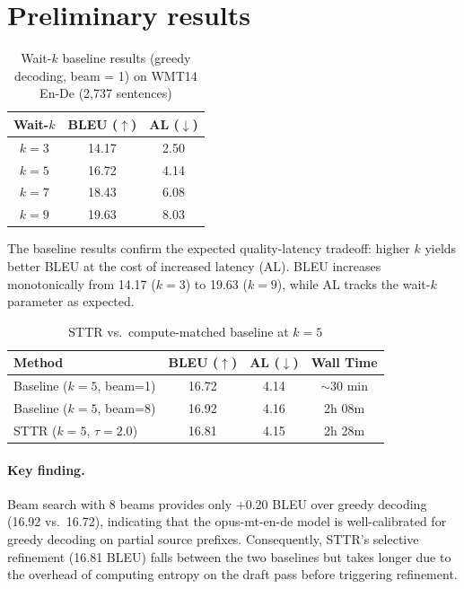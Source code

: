\section{Preliminary results}

\begin{table}[h]
\caption{Wait-$k$ baseline results (greedy decoding, beam = 1) on WMT14 En-De (2,737 sentences)}
\label{tab:baseline}
\centering
\begin{tabular}{ccc}
    \toprule
    Wait-$k$ & BLEU ($\uparrow$) & AL ($\downarrow$) \\
    \midrule
    $k=3$ & 14.17 & 2.50 \\
    $k=5$ & 16.72 & 4.14 \\
    $k=7$ & 18.43 & 6.08 \\
    $k=9$ & 19.63 & 8.03 \\
    \bottomrule
\end{tabular}
\end{table}

The baseline results confirm the expected quality-latency tradeoff: higher $k$ yields better BLEU at the cost of increased latency (AL). BLEU increases monotonically from 14.17 ($k=3$) to 19.63 ($k=9$), while AL tracks the wait-$k$ parameter as expected.

\begin{table}[h]
\caption{STTR vs.\ compute-matched baseline at $k=5$}
\label{tab:comparison}
\centering
\begin{tabular}{lccc}
    \toprule
    Method & BLEU ($\uparrow$) & AL ($\downarrow$) & Wall Time \\
    \midrule
    Baseline ($k=5$, beam=1) & 16.72 & 4.14 & $\sim$30 min \\
    Baseline ($k=5$, beam=8) & 16.92 & 4.16 & 2h 08m \\
    STTR ($k=5$, $\tau=2.0$) & 16.81 & 4.15 & 2h 28m \\
    \bottomrule
\end{tabular}
\end{table}

\paragraph{Key finding.} Beam search with 8 beams provides only +0.20 BLEU over greedy decoding (16.92 vs.\ 16.72), indicating that the opus-mt-en-de model is well-calibrated for greedy decoding on partial source prefixes. Consequently, STTR's selective refinement (16.81 BLEU) falls between the two baselines but takes longer due to the overhead of computing entropy on the draft pass before triggering refinement.

